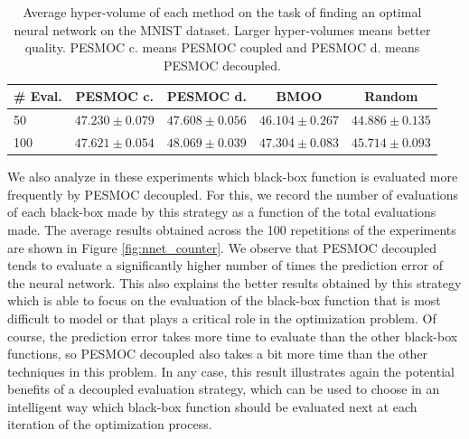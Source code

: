 \documentclass[review,preprint,12pt]{elsarticle}
\begin{document}
\begin{table}
\centering
\caption{Average hyper-volume of each method on the task of finding an optimal neural network on the MNIST dataset.
	Larger hyper-volumes means better quality. PESMOC c. means PESMOC coupled and PESMOC d. means 
PESMOC decoupled.}
\begin{tabular}{lcccc}
 \hline
\textbf{\# Eval.} & \textbf{PESMOC c.} & \textbf{PESMOC d.} & \textbf{BMOO} & \textbf{Random} \\
 \hline
50 & $ 47.230  \pm  0.079 $ & $\mathbf{ 47.608  \pm  0.056 }$ & $ 46.104 \pm 0.267 $ & $ 44.886  \pm  0.135 $ \\
\hline
100 & $ 47.621  \pm  0.054 $ & $\mathbf{ 48.069  \pm  0.039 }$ & $ 47.304  \pm  0.083 $ & $ 45.714  \pm  0.093 $ \\
\hline
\end{tabular}
\label{table:aladdin_hypervolume}
\end{table}

We also analyze in these experiments which black-box function is evaluated more frequently by PESMOC decoupled.
For this, we record the number of evaluations of each black-box made by this strategy as a function of the 
total evaluations made. The average results obtained across the 100 repetitions of the experiments are shown 
in Figure \ref{fig:nnet_counter}. We observe that  PESMOC decoupled tends to evaluate a significantly higher
number of times the prediction error of the neural network. This also explains the better results obtained
by this strategy which is able to focus on the evaluation of the black-box function that is most difficult to
model or that plays a critical role in the optimization problem. Of course, the prediction error takes more 
time to evaluate than the other black-box functions, so PESMOC decoupled also takes a bit more time than the 
other techniques in this problem. In any case, this result illustrates again the potential benefits of a 
decoupled evaluation strategy, which can be used to choose in an intelligent way which black-box function 
should be evaluated next at each iteration of the optimization process.
\end{document}
